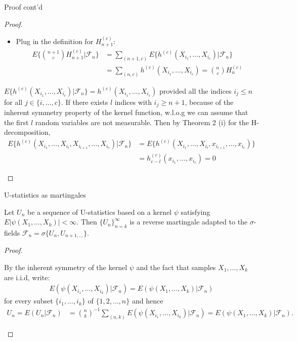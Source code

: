 \documentclass{beamer}
\theoremstyle{definition}
\numberwithin{Def}{section}
\begin{document}
\begin{frame}{Proof cont'd}
\begin{proof}
\begin{fontsize}{9}{12}
\begin{itemize}
    \item Plug in the definition for $H_{n+1}^{(c)}$:
\begin{align*}
E\{{{n+1}\choose c} H_{n+1}^{(c)}|\mathcal{F}_n\}&=
\sum_{(n+1,c)}E\{h^{(c)}(X_{i_1},\dotsc,X_{i_c})|\mathcal{F}_n\}\\
&=\sum_{(n,c)}h^{(c)}(X_{i_1},\dotsc,X_{i_c})={n\choose c}H_n^{(c)}
\end{align*}
\end{itemize}
 $E\{h^{(c)}(X_{i_1},\dotsc,X_{i_c})|\mathcal{F}_n\}=h^{(c)}(X_{i_1},\dotsc,X_{i_c})$ provided all the indices $i_j\le n$ for all $j \in \{i,\dotsc, c\}$. If there exists $l$ indices with $i_j\ge n+1$, because of the inherent symmetry property of the kernel function, w.l.o.g we can assume that the first $l$ random variables are not measurable. Then by Theorem 2 (i) for the H-decomposition,
\begin{align*}
E\{h^{(c)}(X_{i_1},\dotsc,X_{i_l},X_{i_{l+1}},\dotsc, X_{i_c})|\mathcal{F}_n\}&=E\{h^{(c)}(X_{i_1},\dotsc,X_{i_l},x_{i_{l+1}},\dotsc, x_{i_c})\}\\&=h^{(c)}_{c-l}(x_{i_1},\dotsc,x_{i_c})=0
\end{align*}
\end{fontsize}
\end{proof}
\end{frame}

\begin{frame}{U-statistics as martingales}
\begin{theorem}
Let $U_n$ be a sequence of U-statistics based on a kernel $\psi$ satisfying $E|\psi(X_1, \dotsc, X_k)|<\infty$. Then $\{U_n\}_{n=k}^\infty$ is a reverse martingale adapted to the $\sigma$-fields $\mathcal{F}_n=\sigma\{U_n, U_{n+1,\dotsc}\}$.
\end{theorem}
\begin{proof}
\begin{fontsize}{9}{12}
By the inherent symmetry of the kernel $\psi$ and the fact that samples $X_1, \dotsc, X_k$ are i.i.d, write:
\begin{align*}
    E(\psi (X_{i_1}, \dotsc, X_{i_k})|\mathcal{F}_n)=E(\psi (X_1, \dotsc, X_k)|\mathcal{F}_n)
\end{align*}
for every subset $\{i_1, \dotsc, i_k\}$ of $\{1,2,\dotsc,n\}$ and hence 
\begin{align*}
    U_n=E(U_n|\mathcal{F}_n)&={n\choose k}^{-1}\sum_{(n,k)}E(\psi(X_{i_1}, \dotsc,X_{i_k})|\mathcal{F}_n)
    =E(\psi(X_1,\dotsc,X_k)|\mathcal{F}_n).
\end{align*}
\end{fontsize}
\end{proof}
\end{frame}
\end{document}
